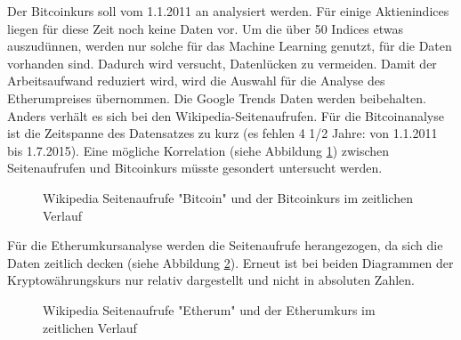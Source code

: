 Der Bitcoinkurs soll vom 1.1.2011 an analysiert werden. Für einige Aktienindices liegen für diese Zeit noch keine Daten vor. Um die über 50 Indices etwas auszudünnen, werden nur solche für das Machine Learning genutzt, für die Daten vorhanden sind. Dadurch wird versucht, Datenlücken zu vermeiden. Damit der Arbeitsaufwand reduziert wird, wird die Auswahl für die Analyse des Etherumpreises übernommen. Die Google Trends Daten werden beibehalten. Anders verhält es sich bei den Wikipedia-Seitenaufrufen. Für die Bitcoinanalyse ist die Zeitspanne des Datensatzes zu kurz (es fehlen 4 1/2 Jahre: von 1.1.2011 bis 1.7.2015). Eine mögliche Korrelation (siehe Abbildung \ref{fig:WikiBTC}) zwischen Seitenaufrufen und Bitcoinkurs müsste gesondert untersucht werden. 
\begin{figure}[H]
\centering
{}
\caption{Wikipedia Seitenaufrufe "Bitcoin" und der Bitcoinkurs im zeitlichen Verlauf}
\label{fig:WikiBTC}
\end{figure}
Für die Etherumkursanalyse werden die Seitenaufrufe herangezogen, da sich die Daten zeitlich decken (siehe Abbildung \ref{fig:WikiETH}). Erneut ist bei beiden Diagrammen der Kryptowährungskurs nur relativ dargestellt und nicht in absoluten Zahlen. 
\begin{figure}[H]
\centering
{}
\caption{Wikipedia Seitenaufrufe "Etherum" und der Etherumkurs im zeitlichen Verlauf}
\label{fig:WikiETH}
\end{figure}
